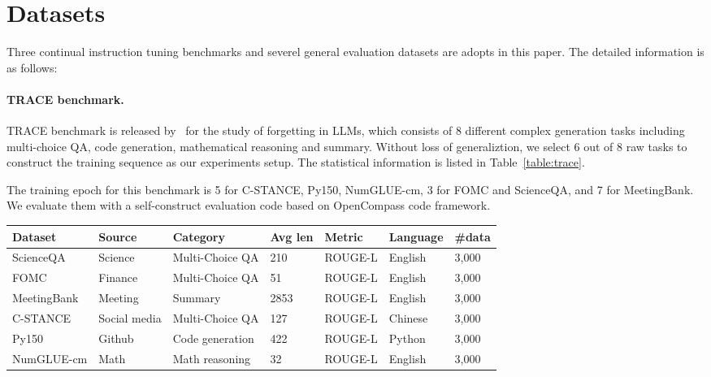 \section{Datasets}
\label{app:dataset}

Three continual instruction tuning benchmarks and severel general evaluation datasets are adopts in this paper. The detailed information is as follows:

\paragraph{TRACE benchmark.}

TRACE benchmark is released by~\citet{wang2023trace} for the study of forgetting in LLMs, which consists of 8 different complex generation tasks including multi-choice QA, code generation, mathematical reasoning and summary. Without loss of generaliztion, we select 6 out of 8 raw tasks to construct the training sequence as our experiments setup. The statistical information is listed in Table~\ref{table:trace}.

The training epoch for this benchmark is 5 for C-STANCE, Py150, NumGLUE-cm, 3 for FOMC and ScienceQA, and 7 for MeetingBank. We evaluate them with a self-construct evaluation code based on OpenCompass code framework.

\begin{table*}[]
\begin{center}
\begin{scriptsize}
\begin{tabular}{l|llllll}
\toprule Dataset & Source & Category & Avg len & Metric & Language & \#data \\ \midrule \midrule
ScienceQA & Science & Multi-Choice QA & 210 & ROUGE-L  & English & 3,000 \\  
FOMC & Finance & Multi-Choice QA & 51 & ROUGE-L & English & 3,000 \\ 
MeetingBank & Meeting& Summary & 2853 & ROUGE-L & English & 3,000 \\ 
C-STANCE & Social media& Multi-Choice QA & 127 & ROUGE-L & Chinese & 3,000 \\ 
Py150 & Github& Code generation & 422 & ROUGE-L  & Python & 3,000 \\ 
NumGLUE-cm & Math & Math reasoning & 32 & ROUGE-L  & English & 3,000 \\
\bottomrule
\end{tabular}
\caption{A summary of dataset statistics in TRACE includes information on the source of the context, average length in terms of word count for English, German, and code datasets, and character count for Chinese.}
\label{table:trace}
\end{scriptsize}
\end{center}
\end{table*}




